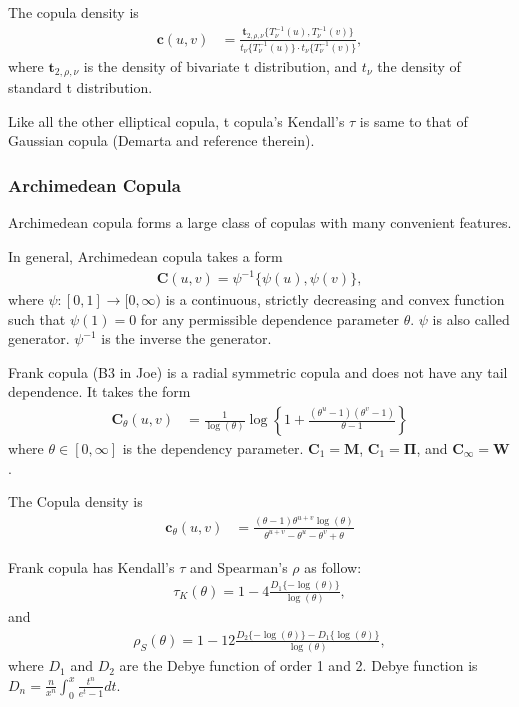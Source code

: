The copula density is
\begin{align}
    \bm{c}(u,v) &= \frac{\bm{t}_{2, \rho, \nu}\{T^{-1}_\nu(u), T^{-1}_\nu(v)\}}
    {t_\nu\{T^{-1}_\nu(u)\}\cdot t_\nu\{T^{-1}_\nu(v)\}},
    \end{align}
where $\bm{t}_{2,\rho, \nu}$ is the density of bivariate t distribution,
and $t_\nu$ the density of standard t distribution.\medskip

Like all the other elliptical copula, t copula's Kendall's $\tau$ is same to that of Gaussian copula (Demarta and reference therein).

\subsubsection{Archimedean Copula}\label{sec:archimedean-copula}
Archimedean copula forms a large class of copulas with many convenient features.\medskip

In general, Archimedean copula takes a form
\begin{align}
    \bm{C}(u,v)= \psi^{-1}\{\psi(u), \psi(v)\},
    \end{align}
where $\psi:[0,1] \rightarrow [0,\infty)$ is a continuous, strictly decreasing and convex function such that
$\psi(1)=0$ for any permissible dependence parameter $\theta$. $\psi$ is also called generator.
$\psi^{-1}$ is the inverse the generator.\medskip

Frank copula (B3 in Joe) is a radial symmetric copula and does not have any tail dependence.
It takes the form
\begin{align}
    \bm{C}_{\theta}(u,v) &= \frac{1}{\log(\theta)}
    \log \left\{
    1 + \frac{(\theta^u-1)(\theta^v-1)}{\theta-1}
    \right\}
    \end{align}
where $\theta \in [0, \infty]$ is the dependency parameter.
$\bm{C}_1 = \bm{M}$, $\bm{C}_1 = \bm{\Pi}$, and $\bm{C}_\infty = \bm{W}$.

The Copula density is
\begin{align}
    \bm{c}_{\theta}(u,v) &= \frac{(\theta-1)\theta^{u+v}\log(\theta)}
    {\theta^{u+v}-\theta^u-\theta^v+\theta}
    \end{align}\medskip

Frank copula has Kendall's $\tau$ and Spearman's $\rho$ as follow:
\begin{align}
    \tau_K(\theta) = 1-4\frac{D_1\{-\log(\theta)\}}{\log(\theta)},
    \end{align}
and
\begin{align}
    \rho_S(\theta) = 1-12\frac{D_2\{-\log(\theta)\} - D_1\{\log(\theta)\}}{\log(\theta)},
    \end{align}
where $D_1$ and $D_2$ are the Debye function of order 1 and 2.
Debye function is $D_n = \frac{n}{x^n}\int_0^x\frac{t^n}{e^t-1}dt$.\medskip

